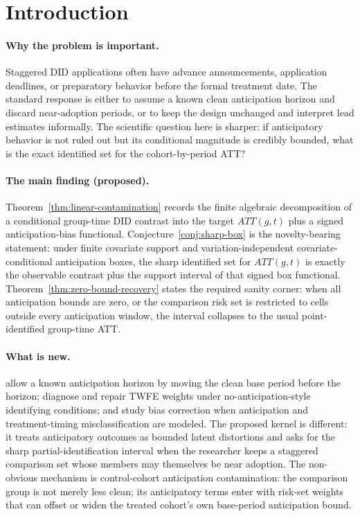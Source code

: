 \documentclass[11pt]{article}
\theoremstyle{definition}
\theoremstyle{plain}
\theoremstyle{remark}
\begin{document}
\section{Introduction}
\paragraph{Why the problem is important.}
Staggered DID applications often have advance announcements, application deadlines, or preparatory behavior before the formal treatment date.  The standard response is either to assume a known clean anticipation horizon and discard near-adoption periods, or to keep the design unchanged and interpret lead estimates informally.  The scientific question here is sharper: if anticipatory behavior is not ruled out but its conditional magnitude is credibly bounded, what is the exact identified set for the cohort-by-period ATT?

\paragraph{The main finding (proposed).}
Theorem~\ref{thm:linear-contamination} records the finite algebraic decomposition of a conditional group-time DID contrast into the target \(ATT(g,t)\) plus a signed anticipation-bias functional.  Conjecture~\ref{conj:sharp-box} is the novelty-bearing statement: under finite covariate support and variation-independent covariate-conditional anticipation boxes, the sharp identified set for \(ATT(g,t)\) is exactly the observable contrast plus the support interval of that signed box functional.  Theorem~\ref{thm:zero-bound-recovery} states the required sanity corner: when all anticipation bounds are zero, or the comparison risk set is restricted to cells outside every anticipation window, the interval collapses to the usual point-identified group-time ATT.

\paragraph{What is new.}
\citet{CallawaySantAnna2021} allow a known anticipation horizon by moving the clean base period before the horizon; \citet{DCDH2020} diagnose and repair TWFE weights under no-anticipation-style identifying conditions; and \citet{AugustinGutknechtLiu2025} study bias correction when anticipation and treatment-timing misclassification are modeled.  The proposed kernel is different: it treats anticipatory outcomes as bounded latent distortions and asks for the sharp partial-identification interval when the researcher keeps a staggered comparison set whose members may themselves be near adoption.  The non-obvious mechanism is control-cohort anticipation contamination: the comparison group is not merely less clean; its anticipatory terms enter with risk-set weights that can offset or widen the treated cohort's own base-period anticipation bound.
\end{document}
